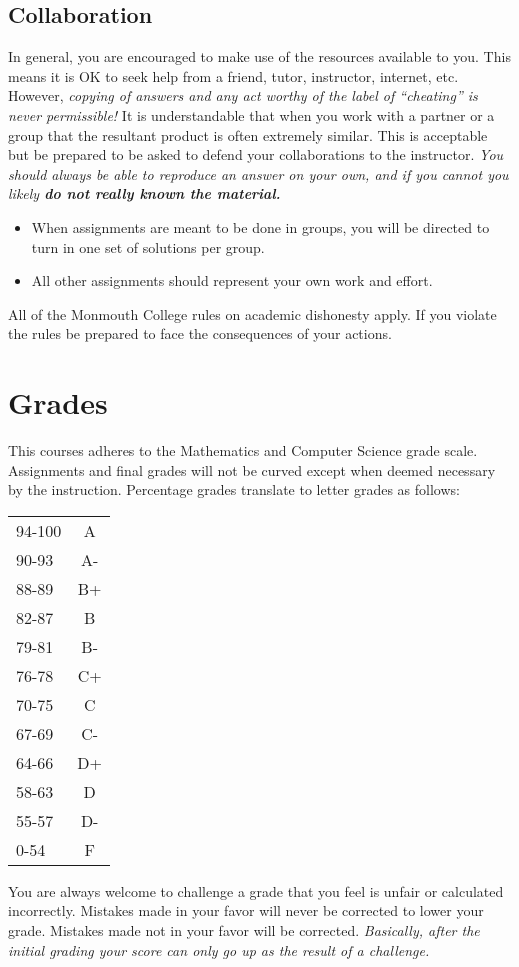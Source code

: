 \documentclass[10pt]{article}
\begin{document}
\subsection{Collaboration}

In general, you are encouraged to make use of the resources available to you.  This means it is OK to seek help from a friend, tutor, instructor, internet, etc.  However, \textit{copying of answers and any act worthy of the label of ``cheating'' is never permissible!}  It is understandable that when you work with a partner or a group that the resultant product is often extremely similar.  This is acceptable but be prepared to be asked to defend your collaborations to the instructor.  \textit{You should always be able to reproduce an answer on your own, and if you cannot you likely \textbf{do not really known the material.}} 
\begin{itemize}
\item When assignments are meant to be done in groups, you will be directed to turn in one set of solutions per group.
\item All other assignments should represent your own work and effort.
\end{itemize}
All of the Monmouth College rules on academic dishonesty apply.  If you violate the rules be prepared to face the consequences of your actions. 



\section{Grades}

This courses adheres to the Mathematics and Computer Science grade scale.  Assignments and final grades will not be curved except when deemed necessary by the instruction.  Percentage grades translate to letter grades as follows:
\newline
\begin{small}
\begin{tabular}{lc}
94-100 & A \\
90-93 & A- \\
88-89 & B+ \\
82-87 & B \\
79-81 & B- \\
76-78 & C+ \\
70-75 & C \\
67-69 & C- \\
64-66 & D+ \\
58-63 & D \\
55-57 & D- \\
0-54 & F 
\end{tabular}
\end{small}
\newline
You are always welcome to challenge a grade that you feel is unfair or calculated incorrectly.  Mistakes made in your favor will never be corrected to lower your grade.  Mistakes made not in your favor will be corrected.  \textit{Basically, after the initial grading your score can only go up as the result of a challenge.}
\end{document}
